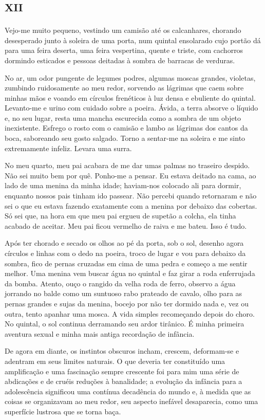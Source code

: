 \chapter*{\huge\centering\textsc{xii}}

Vejo-me muito pequeno, vestindo um camisão até os calcanhares, chorando desesperado junto à soleira de uma porta, num quintal ensolarado cujo portão dá para uma feira deserta, uma feira vespertina, quente e triste, com cachorros dormindo esticados e pessoas deitadas à sombra de barracas de verduras.

No ar, um odor pungente de legumes podres, algumas moscas grandes, violetas, zumbindo ruidosamente ao meu redor, sorvendo as lágrimas que caem sobre minhas mãos e voando em círculos frenéticos à luz densa e ebuliente do quintal. Levanto-me e urino com cuidado sobre a poeira. Ávida, a terra absorve o líquido e, no seu lugar, resta uma mancha escurecida como a sombra de um objeto inexistente. Esfrego o rosto com o camisão e lambo as lágrimas dos cantos da boca, saboreando seu gosto salgado. Torno a sentar-me na soleira e me sinto extremamente infeliz. Levara uma surra.

No meu quarto, meu pai acabara de me dar umas palmas no traseiro despido. Não sei muito bem por quê. Ponho-me a pensar. Eu estava deitado na cama, ao lado de uma menina da minha idade; haviam-nos colocado ali para dormir, enquanto nossos pais tinham ido passear. Não percebi quando retornaram e não sei o que eu estava fazendo exatamente com a menina por debaixo das cobertas. Só sei que, na hora em que meu pai ergueu de supetão a colcha, ela tinha acabado de aceitar. Meu pai ficou vermelho de raiva e me bateu. Isso é tudo.

Após ter chorado e secado os olhos ao pé da porta, sob o sol, desenho agora círculos e linhas com o dedo na poeira, troco de lugar e vou para debaixo da sombra, fico de pernas cruzadas em cima de uma pedra e começo a me sentir melhor. Uma menina vem buscar água no quintal e faz girar a roda enferrujada da bomba. Atento, ouço o rangido da velha roda de ferro, observo a água jorrando no balde como um suntuoso rabo prateado de cavalo, olho para as pernas grandes e sujas da menina, bocejo por não ter dormido nada e, vez ou outra, tento apanhar uma mosca. A vida simples recomeçando depois do choro. No quintal, o sol continua derramando seu ardor tirânico. É minha primeira aventura sexual e minha mais antiga recordação de infância.

De agora em diante, os instintos obscuros incham, crescem, deformam-se e adentram em seus limites naturais. O que deveria ter constituído uma amplificação e uma fascinação sempre crescente foi para mim uma série de abdicações e de cruéis reduções à banalidade; a evolução da infância para a adolescência significou uma contínua decadência do mundo e, à medida que as coisas se organizavam ao meu redor, seu aspecto inefável desaparecia, como uma superfície lustrosa que se torna baça.

